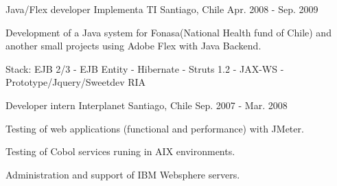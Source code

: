 \begin{cventries}
  \cventry
    {Java/Flex developer} %
    {Implementa TI} %
    {Santiago, Chile} %
    {Apr. 2008 - Sep. 2009} %
    {
      \begin{cvitems} %
        \item { Development of a Java system for Fonasa(National Health fund of Chile)
                and another small projects using Adobe Flex with Java Backend.}
        \item { Stack: EJB 2/3 - EJB Entity - Hibernate - Struts 1.2 - JAX-WS - Prototype/Jquery/Sweetdev RIA}
      \end{cvitems}
    }

  \cventry
    {Developer intern} %
    {Interplanet} %
    {Santiago, Chile} %
    {Sep. 2007 - Mar. 2008} %
    {
      \begin{cvitems} %
        \item { Testing of web applications (functional and performance) with JMeter.}
        \item { Testing of Cobol services runing in AIX environments.}
        \item { Administration and support of IBM Websphere servers.}
      \end{cvitems}
    }

\end{cventries}

